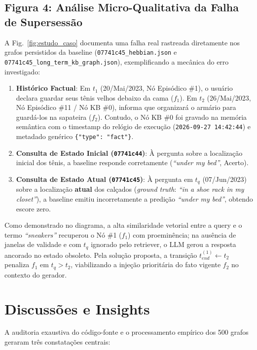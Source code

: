 \documentclass[10pt,conference,twocolumn]{IEEEtran}
\begin{document}
\subsection{Figura 4: Análise Micro-Qualitativa da Falha de Supersessão}
A Fig.~\ref{fig:estudo_caso} documenta uma falha real rastreada diretamente nos grafos persistidos da baseline (\texttt{07741c45\_hebbian.json} e \texttt{07741c45\_long\_term\_kb\_graph.json}), exemplificando a mecânica do erro investigado:
\begin{enumerate}
    \item \textbf{Histórico Factual}: Em $t_1$ (20/Mai/2023, Nó Episódico \#1), o usuário declara guardar seus tênis velhos debaixo da cama ($f_1$). Em $t_2$ (26/Mai/2023, Nó Episódico \#11 / Nó KB \#0), informa que organizará o armário para guardá-los na sapateira ($f_2$). Contudo, o Nó KB \#0 foi gravado na memória semântica com o timestamp do relógio de execução (\texttt{2026-09-27 14:42:44}) e metadado genérico \texttt{\{"type": "fact"\}}.
    \item \textbf{Consulta de Estado Inicial (\texttt{07741c44})}: À pergunta sobre a localização inicial dos tênis, a baseline responde corretamente (\textit{``under my bed''}, Acerto).
    \item \textbf{Consulta de Estado Atual (\texttt{07741c45})}: À pergunta em $t_q$ (07/Jun/2023) sobre a localização \textbf{atual} dos calçados (\textit{ground truth}: \textit{``in a shoe rack in my closet''}), a baseline emitiu incorretamente a predição \textit{``under my bed''}, obtendo escore zero.
\end{enumerate}
Como demonstrado no diagrama, a alta similaridade vetorial entre a query e o termo \textit{``sneakers''} recuperou o Nó \#1 ($f_1$) com proeminência; na ausência de janelas de validade e com $t_q$ ignorado pelo retriever, o LLM gerou a resposta ancorado no estado obsoleto. Pela solução proposta, a transição $t_{end}^{(1)} \leftarrow t_2$ penaliza $f_1$ em $t_q > t_2$, viabilizando a injeção prioritária do fato vigente $f_2$ no contexto do gerador.

\section{Discussões e Insights}

A auditoria exaustiva do código-fonte e o processamento empírico dos 500 grafos geraram três constatações centrais:
\end{document}
